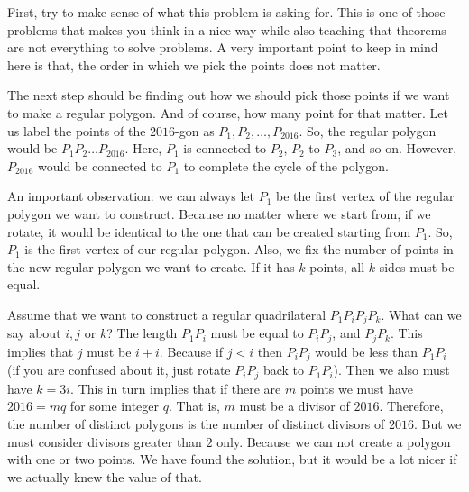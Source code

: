 \documentclass[12pt]{subfile}
\begin{document}
			\begin{solution}
				First, try to make sense of what this problem is asking for. This is one of those problems that makes you think in a nice way while also teaching that theorems are not everything to solve problems. A very important point to keep in mind here is that, the order in which we pick the points does not matter.

				The next step should be finding out how we should pick those points if we want to make a regular polygon. And of course, how many point for that matter. Let us label the points of the $2016$-gon as $P_1,P_2,\ldots,P_{2016}$. So, the regular polygon would be $P_1P_2\ldots P_{2016}$. Here, $P_1$ is connected to $P_2$, $P_2$ to $P_3$, and so on. However, $P_{2016}$ would be connected to $P_1$ to complete the cycle of the polygon.

				An important observation: we can always let $P_1$ be the first vertex of the regular polygon we want to construct. Because no matter where we start from, if we rotate, it would be identical to the one that can be created starting from $P_1$. So, $P_1$ is the first vertex of our regular polygon. Also, we fix the number of points in the new regular polygon we want to create. If it has $k$ points, all $k$ sides must be equal.

				Assume that we want to construct a regular quadrilateral $P_1P_iP_jP_k$. What can we say about $i, j$ or $k$? The length $P_1P_i$ must be equal to $P_iP_j$, and $P_jP_k$. This implies that $j$ must be $i+i$. Because if $j<i$ then $P_iP_j$ would be less than $P_1P_i$ (if you are confused about it, just rotate $P_iP_j$ back to $P_1P_i$). Then we also must have $k=3i$. This in turn implies that if there are $m$ points we must have $2016=mq$ for some integer $q$. That is, $m$ must be a divisor of $2016$. Therefore, the number of distinct polygons is the number of distinct divisors of $2016$. But we must consider divisors greater than $2$ only. Because we can not create a polygon with one or two points. We have found the solution, but it would be a lot nicer if we actually knew the value of that.
			\end{solution}
\end{document}
